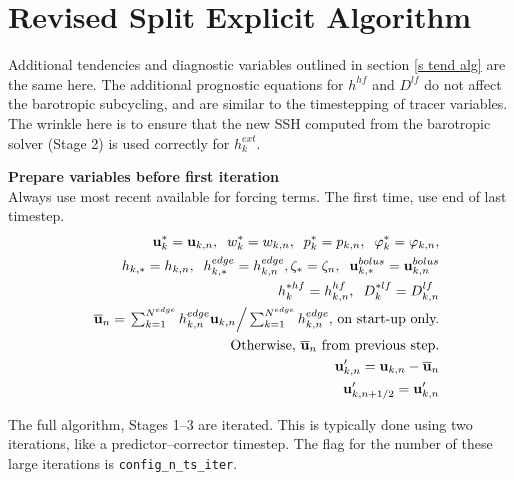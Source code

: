 \documentclass[11pt]{report}
\begin{document}
\newpage
\section{Revised Split Explicit Algorithm}
Additional tendencies and diagnostic variables outlined in section \ref{s tend alg} are the same here.  The additional prognostic equations for $h^{hf}$ and $D^{lf}$ do not affect the barotropic subcycling, and are similar to the timestepping of tracer variables.  The wrinkle here is to ensure that the new SSH computed from the barotropic solver (Stage 2) is used correctly for $h^{ext}_k$.  
\newcommand{\ubtr}{ \overline{\bf u}}
\newcommand{\ubcl}{ {\bf u}'_k}

{\bf Prepare variables before first iteration}\\
Always use most recent available for forcing terms.  The first time, use end of last timestep.
\begin{eqnarray} &&
{\bf u}_k^*={\bf u}_{k,n},\;\;
w_k^*=w_{k,n},\;\;
p_k^*=p_{k,n}, \;\;
{\varphi}_k^* = {\varphi}_{k,n},\\&&
h_{k,*} = h_{k,n}, \;\; h_{k,*}^{edge} = h_{k,n}^{edge},
\zeta_{*} = \zeta_n,\;\;
{\bf u}_{k,*}^{bolus} = {\bf u}_{k,n}^{bolus} \\&&
h^{*hf}_k=h^{hf}_{k,n},\;\;
D^{*lf}_k=D^{lf}_{k,n} \\ &&
\ubtr_n = \left. \textstyle \sum_{k=1}^{N^{edge}}
h_{k,n}^{edge}  {\bf u}_{k,n}
\right/\textstyle 
\sum_{k=1}^{N^{edge}}h_{k,n}^{edge} 
\mbox{, on start-up only.}
\\&&
\mbox{Otherwise, }\ubtr_n\mbox{ from previous step.}\\&&
{\bf u}'_{k,n} = {\bf u}_{k,n} - \ubtr_n \label{ubcl10}
\\&&
{\bf u}_{k,n+1/2}'={\bf u}_{k,n}' 
\end{eqnarray}

The full algorithm, Stages 1--3 are iterated.  This is typically done using two iterations, like a predictor--corrector timestep.  The flag for the number of these large iterations is {\tt config\_n\_ts\_iter}.
\end{document}
